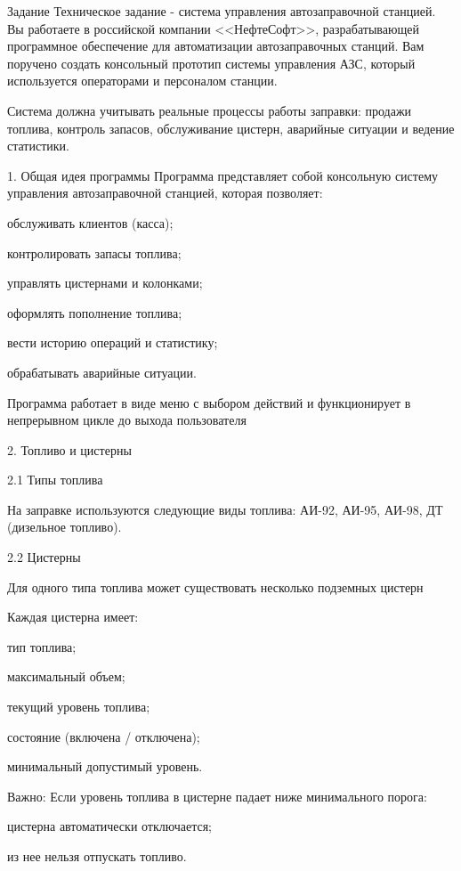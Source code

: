 \documentclass{vvsu}
\begin{document}
\begin{addition}{Задание}
  Техническое задание - система управления автозаправочной станцией. Вы работаете в российской компании <<НефтеСофт>>, разрабатывающей программное обеспечение для автоматизации автозаправочных станций. Вам поручено создать консольный прототип системы управления АЗС, который используется операторами и персоналом станции.

  Система должна учитывать реальные процессы работы заправки: продажи топлива,
контроль запасов, обслуживание цистерн, аварийные ситуации и ведение статистики.

  1. Общая идея программы Программа представляет собой консольную систему
управления автозаправочной станцией, которая позволяет:
\begin{vvsu_itemize}
  \item обслуживать клиентов (касса);
  \item контролировать запасы топлива;
  \item управлять цистернами и колонками;
  \item оформлять пополнение топлива;
  \item вести историю операций и статистику;
  \item обрабатывать аварийные ситуации.
\end{vvsu_itemize}

  Программа работает в виде меню с выбором действий и функционирует в непрерывном цикле до выхода пользователя

  2. Топливо и цистерны
  
  2.1 Типы топлива

  На заправке используются следующие виды топлива: АИ-92, АИ-95, АИ-98, ДТ (дизельное топливо).

  2.2 Цистерны

  Для одного типа топлива может существовать несколько подземных цистерн

  Каждая цистерна имеет:  
\begin{vvsu_itemize}
  \item тип топлива;
  \item максимальный объем;
  \item текущий уровень топлива;
  \item состояние (включена / отключена);
  \item минимальный допустимый уровень.
\end{vvsu_itemize}

 Важно:
  Если уровень топлива в цистерне падает ниже минимального порога:
\begin{vvsu_itemize}
  \item цистерна автоматически отключается;
  \item из нее нельзя отпускать топливо.
\end{vvsu_itemize}


\end{addition}
\end{document}

